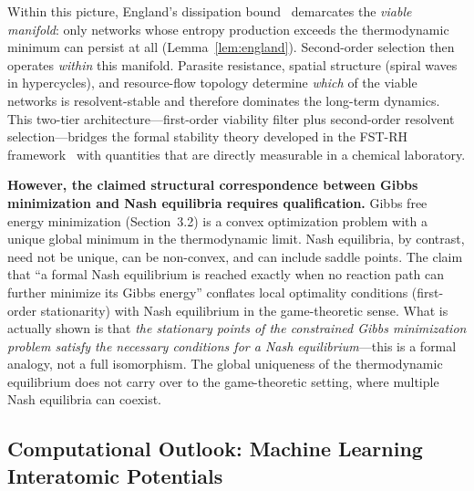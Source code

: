 \documentclass[12pt,a4paper]{article}
\theoremstyle{remark}
\begin{document}
Within this picture, England's dissipation bound~\citep{England2013} demarcates
the \emph{viable manifold}: only networks whose entropy production exceeds the
thermodynamic minimum can persist at all (Lemma~\ref{lem:england}).
Second-order selection then operates \emph{within} this manifold.  Parasite
resistance, spatial structure (spiral waves in hypercycles), and
resource-flow topology determine \emph{which} of the viable networks is
resolvent-stable and therefore dominates the long-term dynamics.
This two-tier architecture---first-order viability filter plus second-order
resolvent selection---bridges the formal stability theory developed in the
FST-RH framework~\citep{GeigerRH2026b} with quantities that are directly
measurable in a chemical laboratory.

\textbf{However, the claimed structural correspondence between Gibbs minimization and Nash equilibria requires qualification.} Gibbs free energy minimization (Section~3.2) is a convex optimization problem with a unique global minimum in the thermodynamic limit. Nash equilibria, by contrast, need not be unique, can be non-convex, and can include saddle points. The claim that ``a formal Nash equilibrium is reached exactly when no reaction path can further minimize its Gibbs energy'' conflates local optimality conditions (first-order stationarity) with Nash equilibrium in the game-theoretic sense. What is actually shown is that \emph{the stationary points of the constrained Gibbs minimization problem satisfy the necessary conditions for a Nash equilibrium}---this is a formal analogy, not a full isomorphism. The global uniqueness of the thermodynamic equilibrium does not carry over to the game-theoretic setting, where multiple Nash equilibria can coexist.

\subsection{Computational Outlook: Machine Learning Interatomic Potentials}
\end{document}
